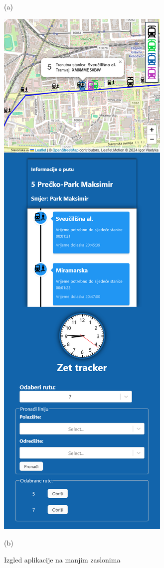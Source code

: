 \documentclass[zavrsnirad]{fer}
\begin{document}
\begin{figure}[H]
\begin{minipage}[c]{0.45\linewidth}
		\caption*{(a)}
		\label{slk:mobitel1}
	\end{minipage}
	\hfill
	\begin{minipage}[c]{0.45\linewidth}
		\centering
		\includegraphics[width=\textwidth]{Figures/mobitel2.png}
		\caption*{(b)}
		\label{slk:mobitel2}
	\end{minipage}
	\caption{Izgled aplikacije na manjim zaslonima}
	\label{fig:mobiteli}
\end{figure}
\end{document}
